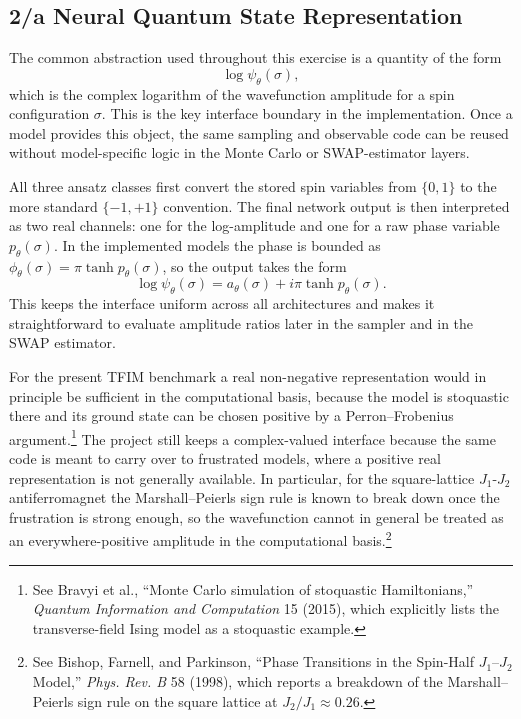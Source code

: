 \documentclass[11pt,a4paper]{article}
\begin{document}
\subsection*{2/a Neural Quantum State Representation}

The common abstraction used throughout this exercise is a quantity of the form
\begin{equation}
    \log \psi_\theta(\sigma),
\end{equation}
which is the complex logarithm of the wavefunction amplitude for a spin configuration $\sigma$. This is the key interface boundary in the implementation. Once a model provides this object, the same sampling and observable code can be reused without model-specific logic in the Monte Carlo or SWAP-estimator layers.

All three ansatz classes first convert the stored spin variables from $\{0,1\}$ to the more standard $\{-1,+1\}$ convention. The final network output is then interpreted as two real channels: one for the log-amplitude and one for a raw phase variable $p_\theta(\sigma)$. In the implemented models the phase is bounded as $\phi_\theta(\sigma)=\pi \tanh p_\theta(\sigma)$, so the output takes the form
\begin{equation}
    \log \psi_\theta(\sigma) = a_\theta(\sigma) + i \pi \tanh p_\theta(\sigma).
\end{equation}
This keeps the interface uniform across all architectures and makes it straightforward to evaluate amplitude ratios later in the sampler and in the SWAP estimator.

For the present TFIM benchmark a real non-negative representation would in principle be sufficient in the computational basis, because the model is stoquastic there and its ground state can be chosen positive by a Perron--Frobenius argument.\footnote{See Bravyi et al., ``Monte Carlo simulation of stoquastic Hamiltonians,'' \emph{Quantum Information and Computation} 15 (2015), which explicitly lists the transverse-field Ising model as a stoquastic example.} The project still keeps a complex-valued interface because the same code is meant to carry over to frustrated models, where a positive real representation is not generally available. In particular, for the square-lattice $J_1$-$J_2$ antiferromagnet the Marshall--Peierls sign rule is known to break down once the frustration is strong enough, so the wavefunction cannot in general be treated as an everywhere-positive amplitude in the computational basis.\footnote{See Bishop, Farnell, and Parkinson, ``Phase Transitions in the Spin-Half $J_1$--$J_2$ Model,'' \emph{Phys. Rev. B} 58 (1998), which reports a breakdown of the Marshall--Peierls sign rule on the square lattice at $J_2/J_1 \approx 0.26$.}
\end{document}
